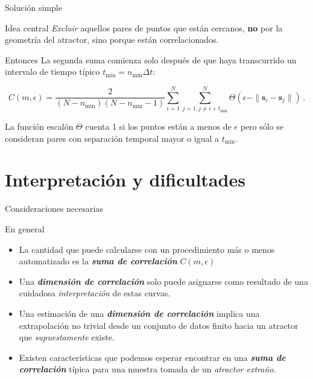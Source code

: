 \documentclass[11pt]{beamer}
\begin{document}
\begin{frame}{Solución simple}
\small
\begin{block}{Idea central}
\textit{Excluir} aquellos pares de puntos que están cercanos, \textbf{no} por la geometría del atractor, sino porque están correlacionados.
\end{block}
\begin{block}{Entonces}
La segunda suma comienza solo después de que haya transcurrido un intervalo de tiempo típico $t_{\min} = n_{\min} \Delta t$:

\begin{equation}
C(m, \epsilon) = \frac{2}{(N - n_{\min})(N - n_{\min} - 1)} \sum_{i=1}^{N} \sum_{j=1, j \neq i + t_{\min}}^{N} \Theta(\epsilon - \| \mathbf{s}_i - \mathbf{s}_j \|) \,.
\end{equation}

La función escalón $\Theta$ cuenta 1 si los puntos están a menos de $\epsilon$ pero sólo se consideran pares con separación temporal mayor o igual a $t_{\min}$.
\end{block}
\end{frame}

\section{Interpretación y dificultades}
\begin{frame} 
\tableofcontents[currentsection] %
\end{frame}

\begin{frame}{Consideraciones necesarias}
\small
\begin{block}{En general}
\begin{itemize}
\item La cantidad que puede calcularse con un procedimiento más o menos automatizado es la \textbf{\textit{suma de correlación}} $C(m, \epsilon)$
\item Una \textit{\textbf{dimensión de correlación}} solo puede asignarse como resultado de una cuidadosa \textit{interpretación} de estas curvas.
\item Una estimación de una \textbf{\textit{dimensión de correlación}} implica una extrapolación no trivial desde un conjunto de datos finito hacia un atractor que \textit{supuestamente} existe.
\item Existen características que podemos esperar encontrar en una \textbf{\textit{suma de correlación}} típica para una muestra tomada de un \textit{atractor extraño.}
\end{itemize}
\end{block}
\end{frame}
\end{document}
